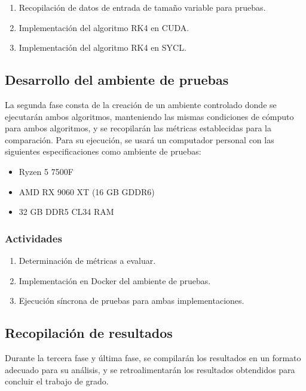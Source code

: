 \documentclass[12pt]{article}
\begin{document}
\begin{enumerate}[label=\thesubsection.\arabic*., wide, labelindent=2em, leftmargin=5em]
	\item Recopilación de datos de entrada de tamaño variable para pruebas.
	\item Implementación del algoritmo RK4 en CUDA.
	\item Implementación del algoritmo RK4 en SYCL.
\end{enumerate}

\subsection{Desarrollo del ambiente de pruebas}

La segunda fase consta de la creación de un ambiente controlado donde se ejecutarán ambos algoritmos, manteniendo las mismas condiciones de cómputo para ambos algoritmos, y se recopilarán las métricas establecidas para la comparación.
Para su ejecución, se usará un computador personal con las siguientes especificaciones como ambiente de pruebas:
\begin{itemize}
	\item Ryzen 5 7500F
	\item AMD RX 9060 XT (16 GB GDDR6)
	\item 32 GB DDR5 CL34 RAM
\end{itemize}
\subsubsection*{Actividades}

\begin{enumerate}[label=\thesubsection.\arabic*., wide, labelindent=2em, leftmargin=5em]
	\item Determinación de métricas a evaluar.
	\item Implementación en Docker del ambiente de pruebas.
	\item Ejecución síncrona de pruebas para ambas implementaciones.
\end{enumerate}

\subsection{Recopilación de resultados}

Durante la tercera fase y última fase, se compilarán los resultados en un formato adecuado para su análisis, y se retroalimentarán los resultados obtendidos para concluir el trabajo de grado.
\end{document}
